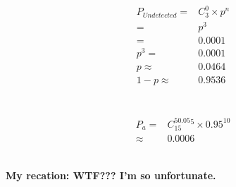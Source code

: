 \documentclass{article}
\begin{document}
            \subsubsection{}
                \begin{equation*}
                    \begin{split}
                        P_{Undetected}=&C_3^0\times p^n\\
                            =&p^3\\
                            =&0.0001\\
                        p^3=&0.0001\\
                        p\approx&0.0464\\
                        1-p\approx&0.9536
                    \end{split}
                \end{equation*}
    \section{}
        \subsection{}
            \begin{equation*}
                \begin{split}
                    P_a=&C_{15}^50.05^5\times0.95^{10}\\
                        \approx&0.0006\\
                \end{split}
            \end{equation*}
        \subsection{}
            \paragraph{
                My recation: WTF??? I'm so unfortunate.
            }
\end{document}

